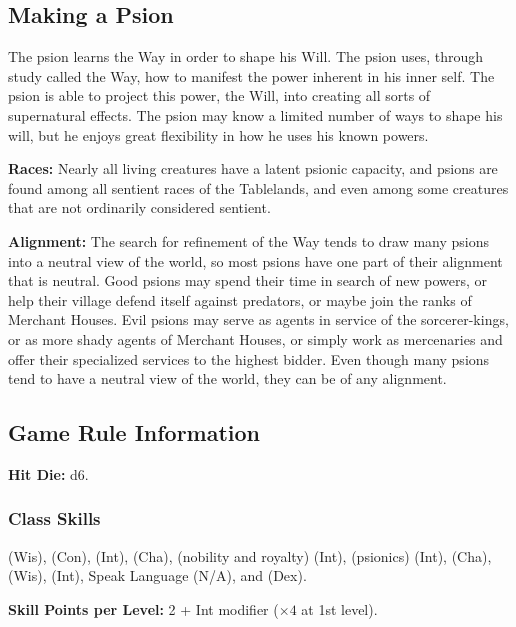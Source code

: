 
\subsection{Making a Psion}
The psion learns the Way in order to shape his Will. The psion uses, through study called the Way, how to manifest the power inherent in his inner self. The psion is able to project this power, the Will, into creating all sorts of supernatural effects. The psion may know a limited number of ways to shape his will, but he enjoys great flexibility in how he uses his known powers.

\textbf{Races:} Nearly all living creatures have a latent psionic capacity, and psions are found among all sentient races of the Tablelands, and even among some creatures that are not ordinarily considered sentient.

\textbf{Alignment:} The search for refinement of the Way tends to draw many psions into a neutral view of the world, so most psions have one part of their alignment that is neutral. Good psions may spend their time in search of new powers, or help their village defend itself against predators, or maybe join the ranks of Merchant Houses. Evil psions may serve as agents in service of the sorcerer-kings, or as more shady agents of Merchant Houses, or simply work as mercenaries and offer their specialized services to the highest bidder. Even though many psions tend to have a neutral view of the world, they can be of any alignment.

\subsection{Game Rule Information}

\textbf{Hit Die:} d6.

\subsubsection{Class Skills}

 (Wis),  (Con),  (Int),  (Cha),  (nobility and royalty) (Int),  (psionics) (Int),  (Cha),  (Wis),  (Int), Speak Language (N/A), and  (Dex).

\textbf{Skill Points per Level:} 2 + Int modifier ($\times 4$ at 1st level).

